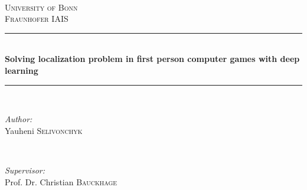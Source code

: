 \begin{titlepage}

\newcommand{\HRule}{\rule{\linewidth}{0.5mm}} %

\center %

\textsc{}\\[2cm]
\textsc{\LARGE University of Bonn}\\[1cm] %
\textsc{\LARGE Fraunhofer IAIS}\\[1cm]


\HRule \\[0.4cm]
{ \huge \bfseries Solving localization problem in first person computer games with deep learning}\\[0.4cm] %
\HRule \\[1.5cm]


\begin{minipage}{0.4\textwidth}
\begin{flushleft} \large
\emph{Author:}\\
Yauheni \textsc{Selivonchyk} %
\end{flushleft}
\end{minipage}
~
\begin{minipage}{0.5\textwidth}
\begin{flushright} \large
\emph{Supervisor:} \\
Prof. Dr. Christian \textsc{Bauckhage} %

\end{flushright}
\end{minipage}\\[0.5cm]


\end{titlepage}
